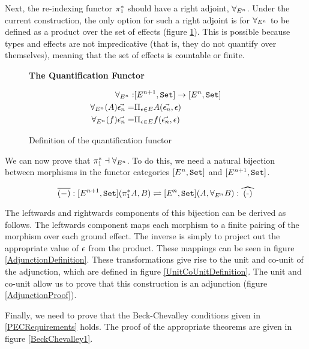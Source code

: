 \documentclass{Report}
\begin{document}
Next, the re-indexing functor $\pi_1^*$ should have a right adjoint, $\forall_{E^n}$. Under the current construction, the only option for such a right adjoint is for $\forall_{E^n}$ to be defined as a product over the set of effects (figure \ref{ProductQuantification}). This is possible because types and effects are not impredicative (that is, they do not quantify over themselves), meaning that the set of effects is countable or finite.

\begin{figure}
    \begin{framed}
        \centering
        \textbf{The Quantification Functor}

        \begin{align*}
            \forall_{E^n}:& [E^{n+1}, \texttt{Set}] \rightarrow [E^n, \texttt{Set}]\\
            \forall_{E^n}(A)\vec{\epsilon_n} =&\Pi_{\epsilon\in E}{A(\vec{\epsilon_n}, \epsilon)}
            \\ 
            \forall_{E^n}(f)\vec{\epsilon_n} =&\Pi_{\epsilon\in E}{f(\vec{\epsilon_n}, \epsilon)}
        \end{align*}
        
    \end{framed}
    \caption{Definition of the quantification functor}
    \label{ProductQuantification}
\end{figure}



We can now prove that $\pi_1^* \dashv \forall_{E^n}$. To do this, we need a natural bijection between morphisms in the functor categories $[E^n, \texttt{Set}]$ and $[E^{n+1}, \texttt{Set}]$.

\begin{equation}
    \bar{(-)}: [E^{n+1}, \set](\pstar A, B) \rightleftharpoons [E^n,\set] (A, \allEn B): \widehat{(-)}
\end{equation}

The leftwards and rightwards components of this bijection can be derived as follows. The leftwards component maps each morphism to a finite pairing of the morphism over each ground effect. The inverse is simply to project out the appropriate value of $\epsilon$ from the product. These mappings can be seen in figure \ref{AdjunctionDefinition}. These transformations give rise to the unit and co-unit of the adjunction, which are defined in figure \ref{UnitCoUnitDefinition}. The unit and co-unit allow us to prove that this construction is an adjunction (figure \ref{AdjunctionProof}). 

Finally, we need to prove that the Beck-Chevalley conditions given in \ref{PECRequirements} holds. The proof of the appropriate theorems are given in figure \ref{BeckChevalley1}.
\end{document}
